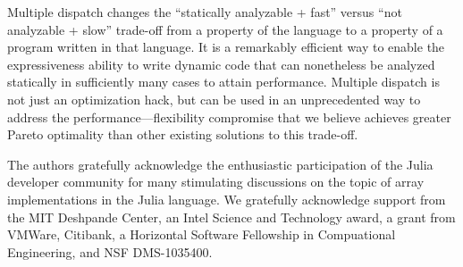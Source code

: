 \documentclass[preprint]{sigplanconf}
\begin{document}
Multiple dispatch changes the ``statically analyzable + fast'' versus ``not
analyzable + slow'' trade-off from a property of the language to a property of
a program written in that language. It is a remarkably efficient way to enable
the expressiveness ability to write dynamic code that can nonetheless be
analyzed statically in sufficiently many cases to attain performance. Multiple
dispatch is not just an optimization hack, but can be used in an unprecedented
way to address the performance---flexibility compromise that we believe
achieves greater Pareto optimality than other existing solutions to this
trade-off.

%

\acks

The authors gratefully acknowledge the enthusiastic participation of the Julia
developer community for many stimulating discussions on the topic of array
implementations in the Julia language.   We gratefully acknowledge
support from the MIT Deshpande Center, an Intel Science and Technology award,
a grant from VMWare, Citibank, a Horizontal Software Fellowship in Compuational Engineering,  and NSF DMS-1035400.





{}





\end{document}
